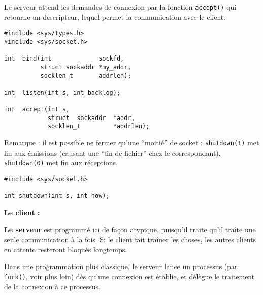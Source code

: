 

Le serveur attend les demandes de connexion par la fonction
\texttt{accept()} qui retourne un descripteur, lequel permet la
communication avec le client.



\extrait
\begin{lstlisting}
#include <sys/types.h>
#include <sys/socket.h>

int  bind(int             sockfd, 
          struct sockaddr *my_addr, 
          socklen_t       addrlen);

int  listen(int s, int backlog);       

int  accept(int s,  
            struct  sockaddr  *addr,  
            socklen_t         *addrlen);
\end{lstlisting}


Remarque : il est possible ne fermer qu'une ``moitié'' de socket :
\texttt{shutdown(1)} met fin aux émissions (causant une ``fin de fichier''
chez le correspondant), \texttt{shutdown(0)} met fin aux réceptions.


\extrait
\begin{lstlisting}
#include <sys/socket.h>

int shutdown(int s, int how);
\end{lstlisting}



\textbf{Le client :}

\source



\textbf{Le serveur} est programmé ici de façon atypique, puisqu'il traite 
 qu'il traîte une seule communication à la fois. Si le client fait traîner
les choses, les autres clients en attente resteront bloqués longtemps.



\source



Dans une programmation plus classique, le serveur lance un processus
(par \texttt{fork()}, voir plus loin) dès qu'une connexion est établie, et 
délègue le traitement de la connexion
à ce processus.


